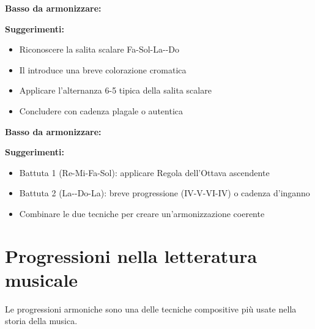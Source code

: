 \begin{esempio}
	\label{ex:esercizio_2}
	
	\textbf{Basso da armonizzare:}
	
	\textbf{Suggerimenti:}
	\begin{itemize}
		\item Riconoscere la salita scalare Fa-Sol-La-\Sibemolle -Do
		\item Il \Mibemolle  introduce una breve colorazione cromatica
		\item Applicare l'alternanza 6-5 tipica della salita scalare
		\item Concludere con cadenza plagale o autentica
	\end{itemize}
\end{esempio}

\begin{esempio}
	\label{ex:esercizio_3}
	
	\textbf{Basso da armonizzare:}
	
	\textbf{Suggerimenti:}
	\begin{itemize}
		\item Battuta 1 (Re-Mi-Fa-Sol): applicare Regola dell'Ottava ascendente
		\item Battuta 2 (La-\Sibemolle -Do-La): breve progressione (IV-V-VI-IV) o cadenza d'inganno
		\item Combinare le due tecniche per creare un'armonizzazione coerente
	\end{itemize}
\end{esempio}

\section{Progressioni nella letteratura musicale}
\label{sec:progressioni_letteratura}

Le progressioni armoniche sono una delle tecniche compositive più usate nella storia della musica.

